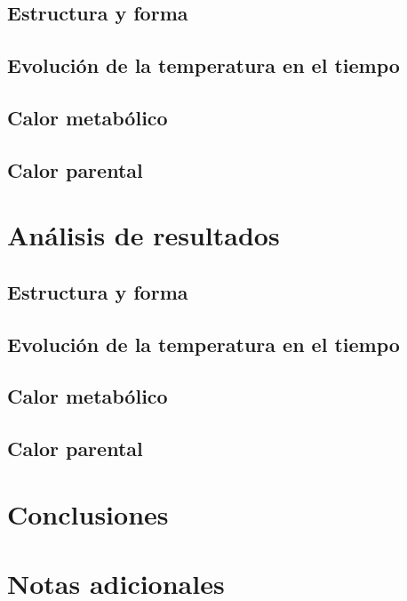 \documentclass{article}
\begin{document}
	\subsection{Estructura y forma}
	
	\subsection{Evolución de la temperatura en el tiempo}
	
	\subsection{Calor metabólico}
	
	\subsection{Calor parental}
	
	\section{Análisis de resultados}
	
	\subsection{Estructura y forma}
	
	\subsection{Evolución de la temperatura en el tiempo}
	
	\subsection{Calor metabólico}
	
	\subsection{Calor parental}
	
	\section{Conclusiones}
	
	\section{Notas adicionales}
	
\end{document}
